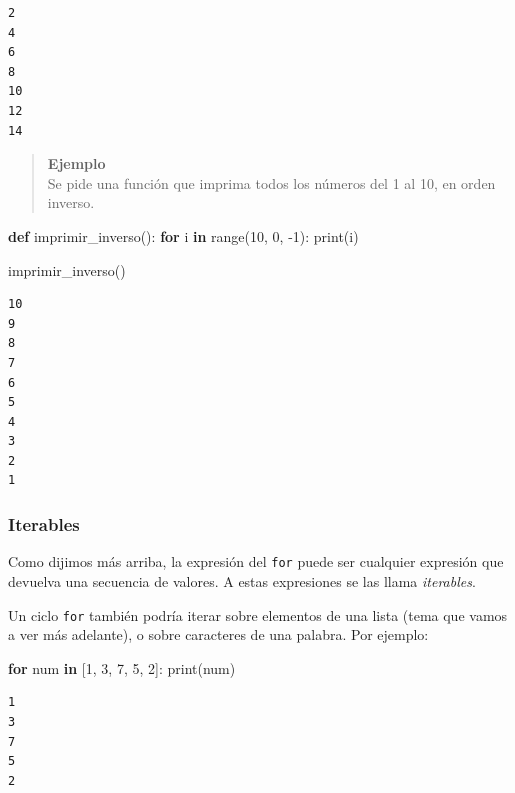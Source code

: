 \documentclass[
  letterpaper,
  DIV=11,
  numbers=noendperiod]{scrreprt}
\newenvironment{Shaded}{\begin{snugshade}}{\end{snugshade}}
\newcommand{\BuiltInTok}[1]{\textcolor[rgb]{0.00,0.23,0.31}{#1}}
\newcommand{\ControlFlowTok}[1]{\textcolor[rgb]{0.00,0.23,0.31}{\textbf{#1}}}
\newcommand{\DecValTok}[1]{\textcolor[rgb]{0.68,0.00,0.00}{#1}}
\newcommand{\KeywordTok}[1]{\textcolor[rgb]{0.00,0.23,0.31}{\textbf{#1}}}
\newcommand{\NormalTok}[1]{\textcolor[rgb]{0.00,0.23,0.31}{#1}}
\newcommand{\OperatorTok}[1]{\textcolor[rgb]{0.37,0.37,0.37}{#1}}
\begin{document}
\begin{verbatim}
2
4
6
8
10
12
14
\end{verbatim}

\hfill\break

\begin{quote}
\textbf{Ejemplo}\\
Se pide una función que imprima todos los números del 1 al 10, en orden
inverso.
\end{quote}

\begin{Shaded}
\begin{Highlighting}[]
\KeywordTok{def}\NormalTok{ imprimir\_inverso():}
  \ControlFlowTok{for}\NormalTok{ i }\KeywordTok{in} \BuiltInTok{range}\NormalTok{(}\DecValTok{10}\NormalTok{, }\DecValTok{0}\NormalTok{, }\OperatorTok{{-}}\DecValTok{1}\NormalTok{):}
      \BuiltInTok{print}\NormalTok{(i)}

\NormalTok{imprimir\_inverso()}
\end{Highlighting}
\end{Shaded}

\begin{verbatim}
10
9
8
7
6
5
4
3
2
1
\end{verbatim}

\hfill\break

\subsubsection{Iterables}\label{iterables}

Como dijimos más arriba, la expresión del \texttt{for} puede ser
cualquier expresión que devuelva una secuencia de valores. A estas
expresiones se las llama \emph{iterables}.

Un ciclo \texttt{for} también podría iterar sobre elementos de una lista
(tema que vamos a ver más adelante), o sobre caracteres de una palabra.
Por ejemplo:

\begin{Shaded}
\begin{Highlighting}[]
\ControlFlowTok{for}\NormalTok{ num }\KeywordTok{in}\NormalTok{ [}\DecValTok{1}\NormalTok{, }\DecValTok{3}\NormalTok{, }\DecValTok{7}\NormalTok{, }\DecValTok{5}\NormalTok{, }\DecValTok{2}\NormalTok{]:}
    \BuiltInTok{print}\NormalTok{(num)}
\end{Highlighting}
\end{Shaded}

\begin{verbatim}
1
3
7
5
2
\end{verbatim}
\end{document}
